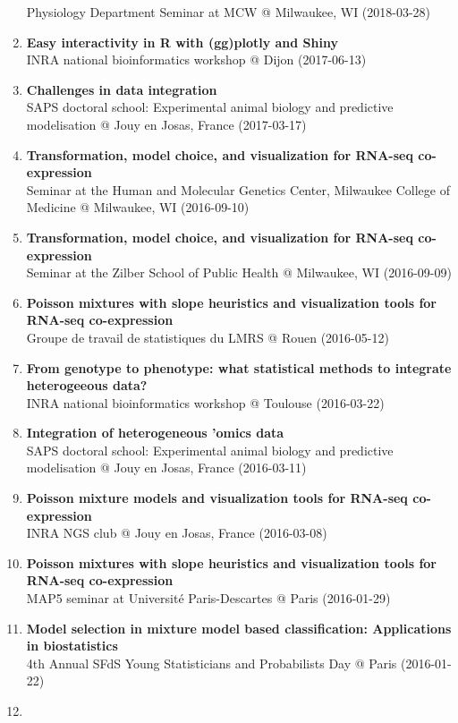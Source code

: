 \documentclass[11pt, a4paper]{awesome-cv}
\begin{document}
\begin{enumerate}
  Physiology Department Seminar at MCW @ Milwaukee, WI (2018-03-28)
\item
  \textbf{Easy interactivity in R with (gg)plotly and Shiny}\\
  INRA national bioinformatics workshop @ Dijon (2017-06-13)
\item
  \textbf{Challenges in data integration}\\
  SAPS doctoral school: Experimental animal biology and predictive
  modelisation @ Jouy en Josas, France (2017-03-17)
\item
  \textbf{Transformation, model choice, and visualization for RNA-seq
  co-expression}\\
  Seminar at the Human and Molecular Genetics Center, Milwaukee College
  of Medicine @ Milwaukee, WI (2016-09-10)
\item
  \textbf{Transformation, model choice, and visualization for RNA-seq
  co-expression}\\
  Seminar at the Zilber School of Public Health @ Milwaukee, WI
  (2016-09-09)
\item
  \textbf{Poisson mixtures with slope heuristics and visualization tools
  for RNA-seq co-expression}\\
  Groupe de travail de statistiques du LMRS @ Rouen (2016-05-12)
\item
  \textbf{From genotype to phenotype: what statistical methods to
  integrate heterogeeous data?}\\
  INRA national bioinformatics workshop @ Toulouse (2016-03-22)
\item
  \textbf{Integration of heterogeneous 'omics data}\\
  SAPS doctoral school: Experimental animal biology and predictive
  modelisation @ Jouy en Josas, France (2016-03-11)
\item
  \textbf{Poisson mixture models and visualization tools for RNA-seq
  co-expression}\\
  INRA NGS club @ Jouy en Josas, France (2016-03-08)
\item
  \textbf{Poisson mixtures with slope heuristics and visualization tools
  for RNA-seq co-expression}\\
  MAP5 seminar at Université Paris-Descartes @ Paris (2016-01-29)
\item
  \textbf{Model selection in mixture model based classification:
  Applications in biostatistics}\\
  4th Annual SFdS Young Statisticians and Probabilists Day @ Paris
  (2016-01-22)
\item

\end{enumerate}
\end{document}
